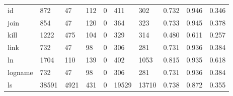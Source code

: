 \begin{longtable}{lp{2.0cm}p{2.0cm}p{2.0cm}p{2.0cm}p{2.0cm}p{2.0cm}p{2.0cm}p{2.0cm}p{2.0cm}}
id        &                    872 &                                 47 &                               112 &                                0 &                               411 &                             302 &                                0.732 &                                  0.946 &                                0.346 \\
join      &                    854 &                                 47 &                               120 &                                0 &                               364 &                             323 &                                0.733 &                                  0.945 &                                0.378 \\
kill      &                   1222 &                                475 &                               104 &                                0 &                               329 &                             314 &                                0.480 &                                  0.611 &                                0.257 \\
link      &                    732 &                                 47 &                                98 &                                0 &                               306 &                             281 &                                0.731 &                                  0.936 &                                0.384 \\
ln        &                   1704 &                                110 &                               139 &                                0 &                               402 &                            1053 &                                0.815 &                                  0.935 &                                0.618 \\
logname   &                    732 &                                 47 &                                98 &                                0 &                               306 &                             281 &                                0.731 &                                  0.936 &                                0.384 \\
ls        &                  38591 &                               4921 &                               431 &                                0 &                             19529 &                           13710 &                                0.738 &                                  0.872 &                                0.355 \\

\end{longtable}
